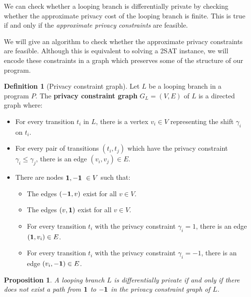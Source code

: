 \documentclass[12pt]{article}
\newtheorem{prop}[thm]{Proposition}
\theoremstyle{definition}
\newtheorem{defn}[thm]{Definition}
\begin{document}
We can check whether a looping branch is differentially private by checking whether the approximate privacy cost of the looping branch is finite. This is true if and only if the \textit{approximate privacy constraints} are feasible.

We will give an algorithm to check whether the approximate privacy constraints are feasible. Although this is equivalent to solving a 2SAT instance, we will encode these constraints in a graph which preserves some of the structure of our program. 

\begin{defn}[Privacy constraint graph]
    Let $L$ be a looping branch in a program $P$. The \textbf{privacy constraint graph} $G_L = (V, E)$ of $L$ is a directed graph where: 
    \begin{itemize}
        \item For every transition $t_i$ in $L$, there is a vertex $v_i \in V$ representing the shift $\gamma_i$ on $t_i$.
        \item For every pair of transitions $(t_i, t_j)$ which have the privacy constraint $\gamma_i \leq \gamma_j$, there is an edge $(v_i, v_j) \in E$.
        \item There are nodes ${\bf 1, -1}\ \in V$ such that: 
        \begin{itemize}
            \item The edges $({\bf -1}, v)$ exist for all $v \in V$.
            \item The edges $(v, {\bf 1})$ exist for all $v \in V$.
            \item For every transition $t_i$ with the privacy constraint $\gamma_i = 1$, there is an edge $({\bf 1}, v_i) \in E$.
            \item For every transition $t_i$ with the privacy constraint $\gamma_i = -1$, there is an edge $(v_i, {\bf -1}) \in E$. 
        \end{itemize}
    \end{itemize}

\end{defn}

\begin{prop}
    A looping branch $L$ is differentially private if and only if there does not exist a path from $\bf 1$ to $\bf -1$ in the privacy constraint graph of $L$.
\end{prop}
\end{document}
